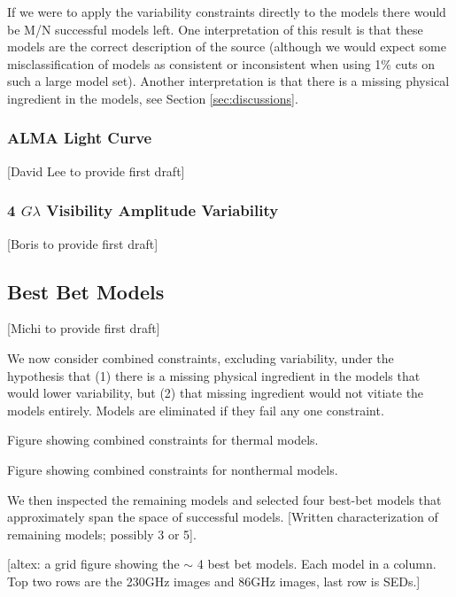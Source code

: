 If we were to apply the variability constraints directly to the models there would be M/N successful models left.  One interpretation of this result is that these models are the correct description of the source (although we would expect some misclassification of models as consistent or inconsistent when using 1\% cuts on such a large model set).  Another interpretation is that there is a missing physical ingredient in the models, see Section \ref{sec:discussions}.   

\subsubsection{ALMA Light Curve}

[David Lee to provide first draft]

\subsubsection{4 $G\lambda$ Visibility Amplitude Variability}

[Boris to provide first draft]

\subsection{Best Bet Models}

[Michi to provide first draft]

We now consider combined constraints, excluding variability, under the hypothesis that (1) there is a missing physical ingredient in the models that would lower variability, but (2) that missing ingredient would not vitiate the models entirely.  Models are eliminated if they fail any one constraint.

Figure showing combined constraints for thermal models.

Figure showing combined constraints for nonthermal models.

We then inspected the remaining models and selected four best-bet models that approximately span the space of successful models.  [Written characterization of remaining models; possibly 3 or 5].  

\begin{figure*}
    \centering
    [altex: a grid figure showing the $\sim$ 4 best bet models.  Each model in a column.  Top two rows are the 230GHz images and 86GHz images, last row is SEDs.]
    \caption{Best bet models.  Each column corresponds to one best bet model; top row shows a 230GHz image [average or selected image; or use GIF?]; middle row shows an 86GHz images; bottom row shows SEDs.}
    \label{fig:my_label}
\end{figure*}

